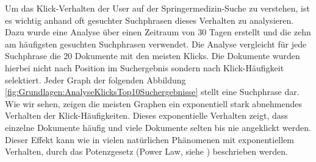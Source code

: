 
Um das Klick-Verhalten der User auf der Springermedizin-Suche zu verstehen, ist es wichtig anhand oft gesuchter Suchphrasen dieses Verhalten zu analysieren. Dazu wurde eine Analyse über einen Zeitraum von 30 Tagen erstellt und die zehn am häufigsten gesuchten Suchphrasen verwendet. Die Analyse vergleicht für jede Suchphrase die 20 Dokumente mit den meisten Klicks. Die Dokumente wurden hierbei nicht nach Position im Suchergebnis sondern nach Klick-Häufigkeit selektiert. Jeder Graph der folgenden Abbildung \ref{fig:Grundlagen:AnalyseKlicksTop10Suchergebnisse} stellt eine Suchphrase dar. Wie wir sehen, zeigen die meisten Graphen ein exponentiell stark abnehmendes Verhalten der Klick-Häufigkeiten. Dieses exponentielle Verhalten zeigt, dass einzelne Dokumente häufig und viele Dokumente selten bis nie angeklickt werden. Dieser Effekt kann wie in vielen natürlichen Phänomenen mit exponentiellem Verhalten, durch das Potenzgesetz (Power Law, siehe \cite{PowerLaw}) beschrieben werden. 

